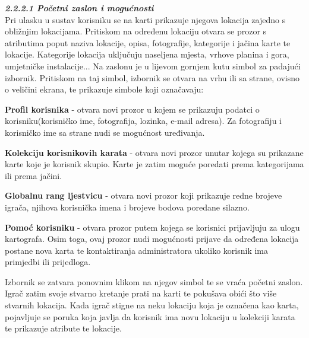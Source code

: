 		\textbf{\textit{\small2.2.2.1 Početni zaslon i mogućnosti}}\\
		
		
		{Pri ulasku u sustav korisniku se na karti prikazuje njegova lokacija zajedno s obližnjim lokacijama. Pritiskom na određenu lokaciju otvara se prozor s atributima poput naziva lokacije, opisa, fotografije, kategorije i jačina karte te lokacije. Kategorije lokacija uključuju naseljena mjesta, vrhove planina i gora, umjetničke instalacije... Na zaslonu je u lijevom gornjem kutu simbol za padajući izbornik. Pritiskom na taj simbol, izbornik se otvara na vrhu ili sa strane, ovisno o veličini ekrana, te prikazuje simbole koji označavaju:  }
		
			\begin{packed_item}
			\item {\textbf{Profil korisnika }- otvara novi prozor u kojem se prikazuju podatci o korisniku(korisničko ime, fotografija, lozinka, e-mail adresa). Za fotografiju i korisničko ime sa strane nudi se mogućnost uređivanja.}\\
			\item {\textbf{Kolekciju korisnikovih karata} - otvara novi prozor unutar kojega su prikazane karte koje je korisnik skupio. Karte je zatim moguće poredati prema kategorijama ili prema jačini.}\\
			\item {\textbf{Globalnu rang ljestvicu} - otvara novi prozor koji prikazuje redne brojeve igrača, njihova korisnička imena i brojeve bodova poredane silazno.}\\
			\item {\textbf{Pomoć korisniku} - otvara prozor putem kojega se korisnici prijavljuju za ulogu kartografa. Osim toga, ovaj prozor nudi mogućnosti prijave da određena lokacija postane nova karta te kontaktiranja administratora ukoliko korisnik ima primjedbi ili prijedloga. }
			\end{packed_item}
		
		{Izbornik se zatvara ponovnim klikom na njegov simbol te se vraća početni zaslon. Igrač zatim svoje stvarno kretanje prati na karti te pokušava obići što više stvarnih lokacija. Kada igrač stigne na neku lokaciju koja je označena kao karta, pojavljuje se poruka koja javlja da korisnik ima novu lokaciju u kolekciji karata te prikazuje atribute te lokacije.}\newpage
		
